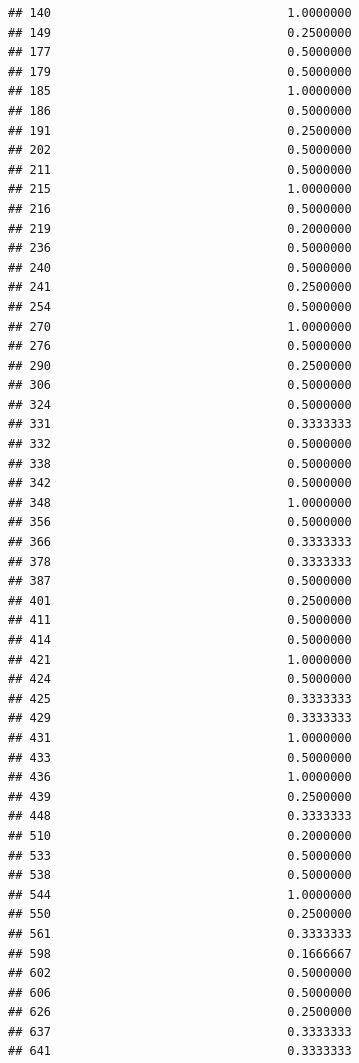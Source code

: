 \documentclass[
]{article}
\begin{document}
\begin{verbatim}
## 140                                 1.0000000
## 149                                 0.2500000
## 177                                 0.5000000
## 179                                 0.5000000
## 185                                 1.0000000
## 186                                 0.5000000
## 191                                 0.2500000
## 202                                 0.5000000
## 211                                 0.5000000
## 215                                 1.0000000
## 216                                 0.5000000
## 219                                 0.2000000
## 236                                 0.5000000
## 240                                 0.5000000
## 241                                 0.2500000
## 254                                 0.5000000
## 270                                 1.0000000
## 276                                 0.5000000
## 290                                 0.2500000
## 306                                 0.5000000
## 324                                 0.5000000
## 331                                 0.3333333
## 332                                 0.5000000
## 338                                 0.5000000
## 342                                 0.5000000
## 348                                 1.0000000
## 356                                 0.5000000
## 366                                 0.3333333
## 378                                 0.3333333
## 387                                 0.5000000
## 401                                 0.2500000
## 411                                 0.5000000
## 414                                 0.5000000
## 421                                 1.0000000
## 424                                 0.5000000
## 425                                 0.3333333
## 429                                 0.3333333
## 431                                 1.0000000
## 433                                 0.5000000
## 436                                 1.0000000
## 439                                 0.2500000
## 448                                 0.3333333
## 510                                 0.2000000
## 533                                 0.5000000
## 538                                 0.5000000
## 544                                 1.0000000
## 550                                 0.2500000
## 561                                 0.3333333
## 598                                 0.1666667
## 602                                 0.5000000
## 606                                 0.5000000
## 626                                 0.2500000
## 637                                 0.3333333
## 641                                 0.3333333

\end{verbatim}
\end{document}
